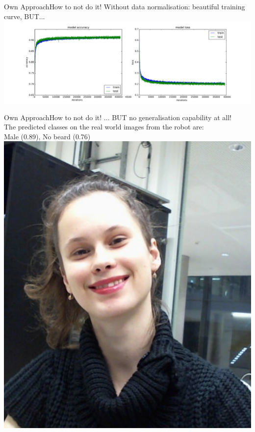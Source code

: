 \documentclass{beamer}
\begin{document}
\begin{frame}{Own Approach}{How to not do it!}
Without data normalisation: beautiful training curve, BUT...
\hspace*{-2.4cm}
	\includegraphics[height=0.6\textheight]{figures/lossBad} 
\end{frame}

\begin{frame}{Own Approach}{How to not do it!}
... BUT no generalisation capability at all! \\
The predicted classes on the real world images from the robot are: \\
\centering
Male (0.89), No beard (0.76) \\
\includegraphics[height=0.6\textheight]{figures/failMaleNoBeard} 
\end{frame}
\end{document}

